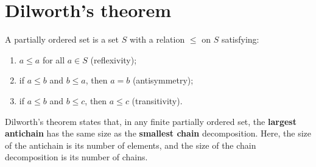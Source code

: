 \section*{Dilworth’s theorem}

A partially ordered set is a set $S$ with a relation $\le$ on $S$ satisfying:
\begin{enumerate}
\item $a \le a$ for all $a \in S$ (reflexivity);
\item if $a \le b$ and $b \le a$, then $a = b$ (antisymmetry);
\item if $a \le b$ and $b \le c$, then $a \le c$ (transitivity).
\end{enumerate}

Dilworth's theorem states that, in any finite partially ordered set, 
the \textbf{largest antichain} has the same size as the \textbf{smallest chain} decomposition. 
Here, the size of the antichain is its number of elements, and the size of the chain decomposition is its number of chains.
